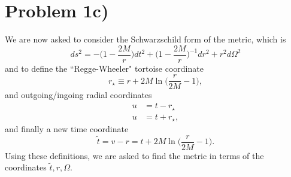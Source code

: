 \documentclass[12pt]{article}
\numberwithin{equation}{section}
\begin{document}
\section{Problem 1c)}
We are now asked to consider the Schwarzschild form of the metric, which is
\begin{equation}
ds^2 = - \Big( 1 - \frac{2 M}{r} \Big) dt^2 + \Big(1 - \frac{2 M}{r} \Big)^{-1} dr^2 + r^2 d\Omega^2
\end{equation}
and to define the ``Regge-Wheeler" tortoise coordinate
\begin{equation}
r_\star \equiv r + 2 M \ln \Big( \frac{r}{2 M} - 1 \Big),
\end{equation}
and outgoing/ingoing radial coordinates
\begin{equation}
\begin{aligned}
u &= t - r_\star \\
u &= t + r_\star,
\end{aligned}
\end{equation}
and finally a new time coordinate
\begin{equation}
\tilde{t} = v - r = t + 2 M \ln \Big( \frac{r}{2 M} - 1 \Big).
\end{equation}
Using these definitions, we are asked to find the metric in terms of the coordinates $\tilde{t}, r, \Omega$.
\end{document}
